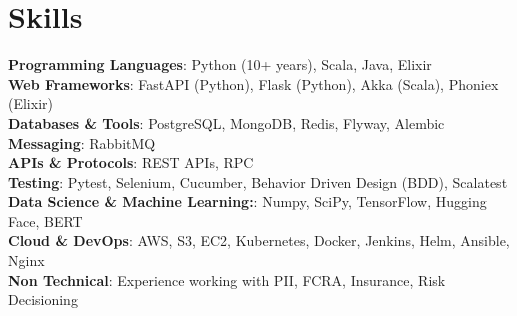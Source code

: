\documentclass[letterpaper,11pt]{article}
\makeatletter
\newcommand{\resumeItem}[1]{
  \item\small{
    {#1 \vspace{-2pt}}
  }
}
\newcommand{\resumeProjectHeading}[2]{
    \item
    \begin{tabular*}{0.97\textwidth}{l@{\extracolsep{\fill}}r}
      \small#1 & #2 \\
    \end{tabular*}\vspace{-7pt}
}
\newcommand{\resumeSubHeadingListStart}{\begin{itemize}[leftmargin=0.15in, label={}]}
\newcommand{\resumeSubHeadingListEnd}{\end{itemize}}
\newcommand{\resumeItemListStart}{\begin{itemize}}
\newcommand{\resumeItemListEnd}{\end{itemize}\vspace{-5pt}}
\makeatother
\begin{document}


%
\section{Skills}
 \begin{itemize}[leftmargin=0.15in, label={}]
    \small{\item{
     \textbf{Programming Languages}{: Python (10+ years), Scala, Java, Elixir} \\
     \textbf{Web Frameworks}{: FastAPI (Python), Flask (Python), Akka (Scala), Phoniex (Elixir) } \\
     \textbf{Databases \& Tools}{: PostgreSQL, MongoDB, Redis, Flyway, Alembic} \\
     \textbf{Messaging}{: RabbitMQ} \\
     \textbf{APIs \& Protocols}{: REST APIs, RPC} \\
     \textbf{Testing}{: Pytest, Selenium, Cucumber, Behavior Driven Design (BDD), Scalatest} \\
     \textbf{Data Science \& Machine Learning:}{: Numpy, SciPy, TensorFlow, Hugging Face, BERT}\\
     \textbf{Cloud \& DevOps}{: AWS, S3, EC2, Kubernetes, Docker, Jenkins, Helm, Ansible, Nginx} \\
     \textbf{Non Technical}{: Experience working with PII, FCRA, Insurance, Risk Decisioning} \\
    }}
 \end{itemize}


\end{document}
